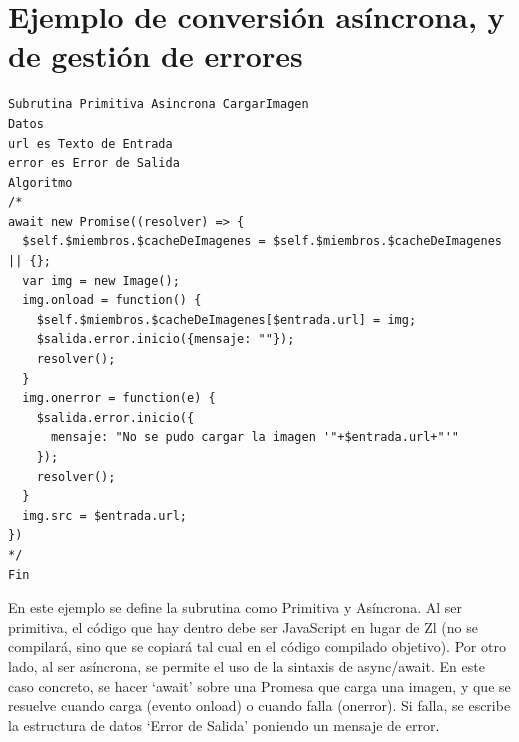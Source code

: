 \documentclass{report}
\begin{document}
	\chapter{Ejemplo de conversión asíncrona, y de gestión de errores} \label{app:e}

\begin{BVerbatim}
Subrutina Primitiva Asincrona CargarImagen
Datos
url es Texto de Entrada
error es Error de Salida
Algoritmo
/*
await new Promise((resolver) => {
  $self.$miembros.$cacheDeImagenes = $self.$miembros.$cacheDeImagenes || {};
  var img = new Image();
  img.onload = function() {
    $self.$miembros.$cacheDeImagenes[$entrada.url] = img;
    $salida.error.inicio({mensaje: ""});          
    resolver();
  }
  img.onerror = function(e) {
    $salida.error.inicio({
      mensaje: "No se pudo cargar la imagen '"+$entrada.url+"'"
    });      
    resolver();
  }
  img.src = $entrada.url;
})
*/
Fin
\end{BVerbatim}
\begin{center}
	En este ejemplo se define la subrutina como Primitiva y Asíncrona. Al ser primitiva, el código que hay dentro debe ser JavaScript en lugar de Zl (no se compilará, sino que se copiará tal cual en el código compilado objetivo). Por otro lado, al ser asíncrona, se permite el uso de la sintaxis de async/await. En este caso concreto, se hacer `await' sobre una Promesa que carga una imagen, y que se resuelve cuando carga (evento onload) o cuando falla (onerror). Si falla, se escribe la estructura de datos `Error de Salida' poniendo un mensaje de error.
\end{center}
	
\end{document}
